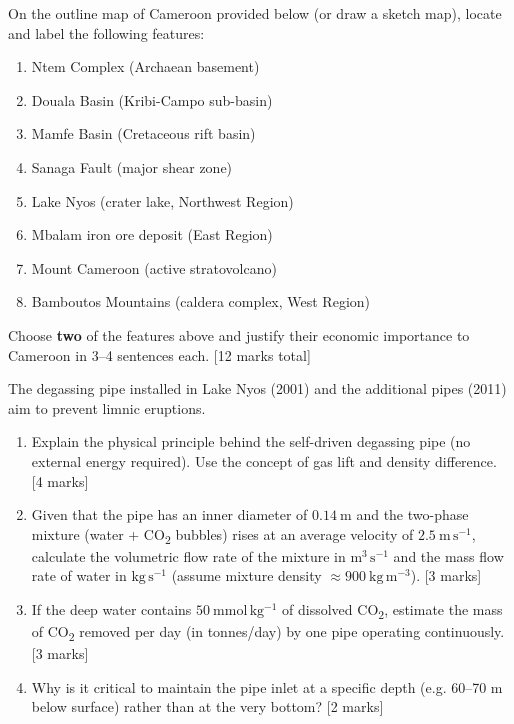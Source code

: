 \documentclass[11pt]{article}
\begin{document}
\begin{exercice}
On the outline map of Cameroon provided below (or draw a sketch map), locate and label the following features:
\begin{enumerate}
\item Ntem Complex (Archaean basement)
\item Douala Basin (Kribi-Campo sub-basin)
\item Mamfe Basin (Cretaceous rift basin)
\item Sanaga Fault (major shear zone)
\item Lake Nyos (crater lake, Northwest Region)
\item Mbalam iron ore deposit (East Region)
\item Mount Cameroon (active stratovolcano)
\item Bamboutos Mountains (caldera complex, West Region)
\end{enumerate}
Choose \textbf{two} of the features above and justify their economic importance to Cameroon in 3–4 sentences each. [12 marks total]
\end{exercice}

\begin{exercice}
The degassing pipe installed in Lake Nyos (2001) and the additional pipes (2011) aim to prevent limnic eruptions.
\begin{enumerate}
\item Explain the physical principle behind the self-driven degassing pipe (no external energy required). Use the concept of gas lift and density difference. [4 marks]
\item Given that the pipe has an inner diameter of $0.14\ \mathrm{m}$ and the two-phase mixture (water + CO\textsubscript{2} bubbles) rises at an average velocity of $2.5\ \mathrm{m\,s^{-1}}$, calculate the volumetric flow rate of the mixture in $\mathrm{m}^3\,\mathrm{s}^{-1}$ and the mass flow rate of water in $\mathrm{kg\,s^{-1}}$ (assume mixture density $\approx 900\ \mathrm{kg\,m^{-3}}$). [3 marks]
\item If the deep water contains $50\ \mathrm{mmol\,kg^{-1}}$ of dissolved CO\textsubscript{2}, estimate the mass of CO\textsubscript{2} removed per day (in tonnes/day) by one pipe operating continuously. [3 marks]
\item Why is it critical to maintain the pipe inlet at a specific depth (e.g. 60–70 m below surface) rather than at the very bottom? [2 marks]
\end{enumerate}
\end{exercice}
\end{document}
